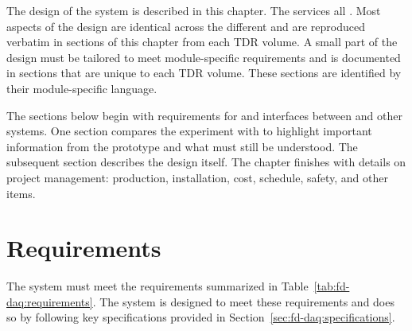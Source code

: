 The design of the    system is described in this chapter.  The  services all  .  Most  aspects of the design are identical across the different  and are reproduced verbatim in sections of this  chapter from each  TDR volume.  A small part of the  design must be tailored to meet module-specific requirements and is documented in sections that are unique to each  TDR volume.  These sections are identified by their module-specific language.

The sections below begin with requirements for and interfaces between  and other  systems.  One section compares the  experiment with  to highlight important information from the prototype and what must still be understood.  The subsequent section describes the design itself.  The chapter finishes with details on project management: production, installation, cost, schedule, safety, and other items.

\section{Requirements}
\label{sec:fd-daq:requirements}


The    system must meet the requirements 
summarized in Table~\ref{tab:fd-daq:requirements}. The system is
designed to meet these requirements and does so by following key
specifications provided in Section~\ref{sec:fd-daq:specifications}. 

% 



